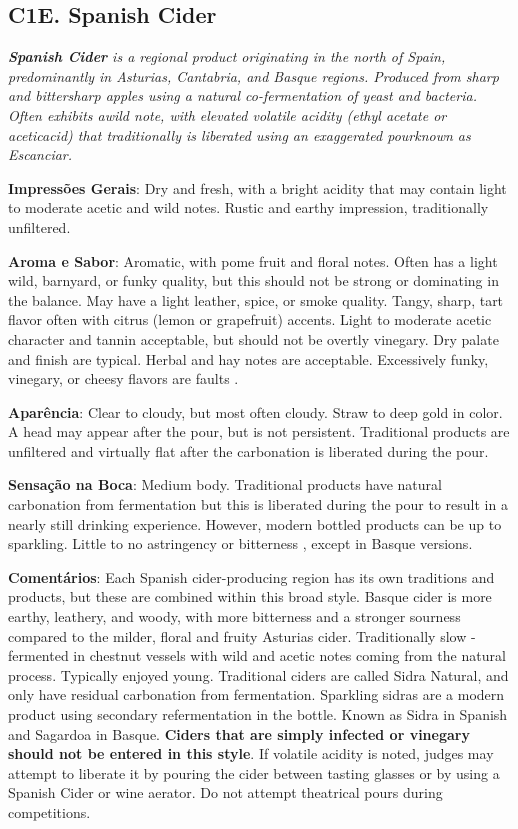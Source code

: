 \subsection*{C1E. Spanish Cider}

\textit{\textbf{Spanish Cider} is a regional product originating in the north of Spain, predominantly in Asturias, Cantabria, and Basque regions. Produced from sharp and bittersharp apples using a natural co-fermentation of yeast and bacteria. Often exhibits awild note, with elevated volatile acidity (ethyl acetate or aceticacid) that traditionally is liberated using an exaggerated pourknown as Escanciar.}

\textbf{Impressões Gerais}: Dry and fresh, with a bright acidity that may contain light to moderate acetic and wild notes. Rustic and earthy impression, traditionally unfiltered.

\textbf{Aroma e Sabor}: Aromatic, with pome fruit and floral notes. Often has a light wild, barnyard, or funky quality, but this should not be strong or dominating in the balance. May have a light leather, spice, or smoke quality. Tangy, sharp, tart flavor often with citrus (lemon or grapefruit) accents. Light to moderate acetic character and tannin acceptable, but should not be overtly vinegary. Dry palate and finish are typical. Herbal and hay notes are acceptable. Excessively funky, vinegary, or cheesy flavors are faults .

\textbf{Aparência}: Clear to cloudy, but most often cloudy. Straw to deep gold in color. A head may appear after the pour, but is not persistent. Traditional products are unfiltered and virtually flat after the carbonation is liberated during the pour.

\textbf{Sensação na Boca}: Medium body. Traditional products have natural carbonation from fermentation but this is liberated during the pour to result in a nearly still drinking experience. However, modern bottled products can be up to sparkling. Little to no astringency or bitterness , except in Basque versions.

\textbf{Comentários}: Each Spanish cider-producing region has its own traditions and products, but these are combined within this broad style. Basque cider is more earthy, leathery, and woody, with more bitterness and a stronger sourness compared to the milder, floral and fruity Asturias cider. Traditionally slow - fermented in chestnut vessels with wild and acetic notes coming from the natural process. Typically enjoyed young. Traditional ciders are called Sidra Natural, and only have residual carbonation from fermentation. Sparkling sidras are a modern product using secondary refermentation in the bottle. Known as Sidra in Spanish and Sagardoa in Basque. \textbf{Ciders that are simply infected or vinegary should not be entered in this style}. If volatile acidity is noted, judges may attempt to liberate it by pouring the cider between tasting glasses or by using a Spanish Cider or wine aerator. Do not attempt theatrical pours during competitions.

